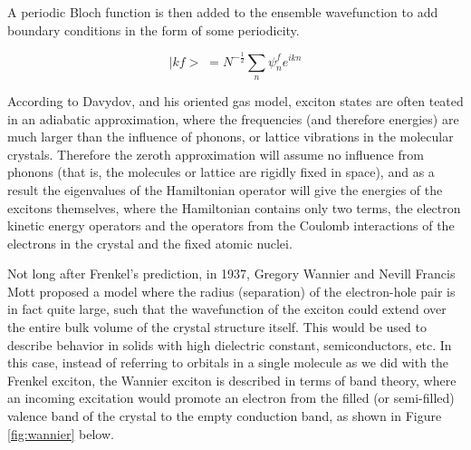 A periodic Bloch function is then added to the ensemble wavefunction to add boundary conditions in the form of some periodicity\cite{Davydov1962}.



\begin{equation}

|kf> \; = N^{-\frac{1}{2}} \sum_n \psi_n^f e^{ikn}  

\label{eq:frenkel2}

\end{equation}



According to Davydov, and his oriented gas model, exciton states are often teated in an adiabatic approximation, where the frequencies (and therefore energies) are much larger than the influence of phonons, or lattice vibrations in the molecular crystals.  Therefore the zeroth approximation will assume no influence from phonons (that is, the molecules or lattice are rigidly fixed in space), and as a result the eigenvalues of the Hamiltonian operator will give the energies of the excitons themselves, where the Hamiltonian contains only two terms, the electron kinetic energy operators and the operators from the Coulomb interactions of the electrons in the crystal and the fixed atomic nuclei\cite{Davydov1962}.   



Not long after Frenkel's prediction, in 1937, Gregory Wannier \cite{Wannier1937} and Nevill Francis Mott proposed a model where the radius (separation) of the electron-hole pair is in fact quite large, such that the wavefunction of the exciton could extend over the entire bulk volume of the crystal structure itself.  This would be used to describe behavior in solids with high dielectric constant, semiconductors, etc.  In this case, instead of referring to orbitals in a single molecule as we did with the Frenkel exciton, the Wannier exciton is described in terms of band theory, where an incoming excitation would promote an electron from the filled (or semi-filled) valence band of the crystal to the empty conduction band, as shown in Figure \ref{fig:wannier} below.



\vspace{8mm}

